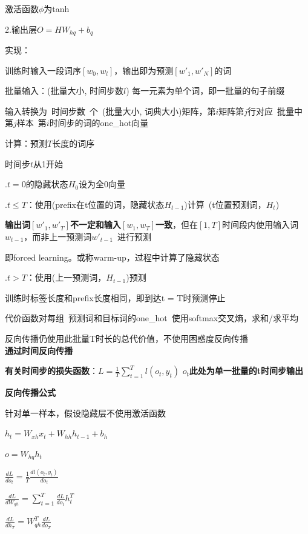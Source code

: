 \documentclass[UTF8]{ctexart}
\begin{document}
  \quad \quad 激活函数$\phi$为tanh

  \quad 2.输出层$O = HW_{hq} + b_q$
  
  实现：

  \quad 训练时输入一段词序$[w_{0}, w_{l}]$，输出即为预测$[w'_{1}, w'_N]$的词
  
  \quad 批量输入：(批量大小, 时间步数$l$) 每一元素为单个词，即一批量的句子前缀
  
  \quad \quad 输入转换为\ 时间步数\ 个\ (批量大小, 词典大小)矩阵，第$i$矩阵第$j$行对应\ 批量中第$j$样本\ 第$i$时间步的词的one\_hot向量
    
  \quad 计算：预测$T$长度的词序

  \quad \quad 时间步$t$从1开始

  \quad {}.$t = 0$的隐藏状态$H_0$设为全0向量

  \quad {}.$t \leq T$：使用(prefix在t位置的词，隐藏状态$H_{t-1}$)计算\ (t位置预测词，$H_t$)

  \quad \quad \quad \textbf{输出词$[w'_{1}, w'_{T}]$不一定和输入$[w_1, w_T]$一致}，但在$[1, T]$时间段内使用输入词$w_{t-1}$，而非上一预测词$w'_{t-1}$\ 进行预测

  \quad \quad \quad 即forced learning。或称warm-up，过程中计算了隐藏状态
  
  \quad {}.$t > T$：使用(上一预测词，$H_{t-1}$)预测

  \quad \quad \quad 训练时标签长度和prefix长度相同，即到达t = T时预测停止
  
  \quad \quad 代价函数对每组\ 预测词和目标词的one\_hot\ 使用softmax交叉熵，求和/求平均
  
  \quad \quad \quad 反向传播仍使用此批量T时长的总代价值，不使用困惑度反向传播\\
\textbf{通过时间反向传播}

  \textbf{有关时间步的损失函数}：$L = \frac{1}{T}\sum_{t = 1}^{T} l(o_t, y_t) $ \textbf{$o_t$此处为单一批量的t时间步输出}

  \textbf{反向传播公式} 
  
  \quad 针对单一样本，假设隐藏层不使用激活函数

  \quad \quad $h_t = W_{xh}x_t + W_{hh}h_{t-1} + b_h$

  \quad \quad $o = W_{hq}h_t$
  
  \quad $\frac{d L}{d o_t} = \frac{1}{T}\frac{d l(o_t, y_t)}{d o_t}$
  
  \quad $\frac{d L}{d W_{qh}} = \sum_{t=1}^{T}\frac{d L}{d o_t}h_t^T$
  
  \quad $\frac{d L}{d h_T} = W_{qh}^T\frac{d L}{d o_T}$
  
\end{document}
